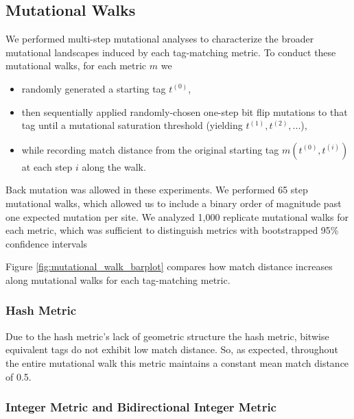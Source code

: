 \subsection{Mutational Walks} \label{sec:mutational_walks}



We performed multi-step mutational analyses to characterize the broader mutational landscapes induced by each tag-matching metric.
To conduct these mutational walks, for each metric $m$ we
\begin{itemize}
    \item randomly generated a starting tag $t^{(0)}$,
    \item then sequentially applied randomly-chosen one-step bit flip mutations to that tag until a mutational saturation threshold (yielding $t^{(1)}, t^{(2)}, ...$),
    \item while recording match distance from the original starting tag $m(t^{(0)}, t^{(i)})$ at each step $i$ along the walk.
\end{itemize}
Back mutation was allowed in these experiments.
We performed 65 step mutational walks, which allowed us to include a binary order of magnitude past one expected mutation per site.
We analyzed 1,000 replicate mutational walks for each metric, which was sufficient to distinguish metrics with bootstrapped 95\% confidence intervals

Figure \ref{fig:mutational_walk_barplot} compares how match distance increases along mutational walks for each tag-matching metric.

\subsubsection{Hash Metric}

Due to the hash metric's lack of geometric structure the hash metric, bitwise equivalent tags do not exhibit low match distance.
So, as expected, throughout the entire mutational walk this metric maintains a constant mean match distance of 0.5.

\subsubsection{Integer Metric and Bidirectional Integer Metric}
\label{sec:mutation_integer}

